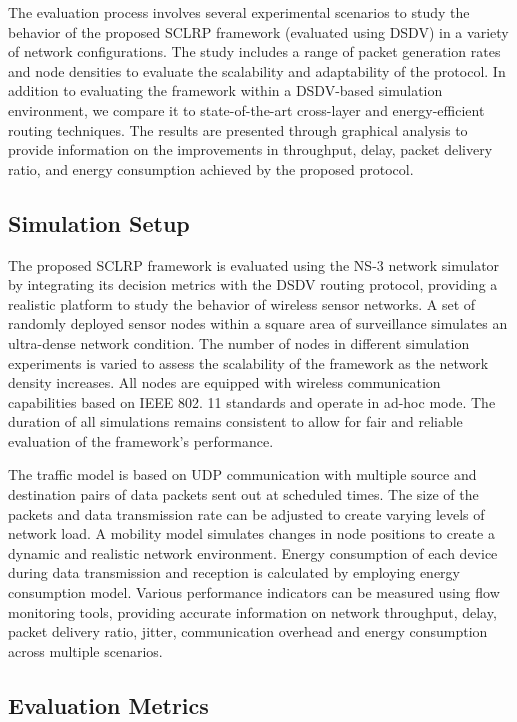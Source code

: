 \documentclass[a4paper,fleqn]{cas-dc}
\numberwithin{equation}{section}
\begin{document}
The evaluation process involves several experimental scenarios to study the behavior of the proposed SCLRP framework (evaluated using DSDV) in a variety of network configurations. The study includes a range of packet generation rates and node densities to evaluate the scalability and adaptability of the protocol. In addition to evaluating the framework within a DSDV-based simulation environment, we compare it to state-of-the-art cross-layer and energy-efficient routing techniques. The results are presented through graphical analysis to provide information on the improvements in throughput, delay, packet delivery ratio, and energy consumption achieved by the proposed protocol.

\subsection{Simulation Setup}

The proposed SCLRP framework is evaluated using the NS-3 network simulator by integrating its decision metrics with the DSDV routing protocol, providing a realistic platform to study the behavior of wireless sensor networks. A set of randomly deployed sensor nodes within a square area of surveillance simulates an ultra-dense network condition. The number of nodes in different simulation experiments is varied to assess the scalability of the framework as the network density increases. All nodes are equipped with wireless communication capabilities based on IEEE 802. 11 standards and operate in ad-hoc mode. The duration of all simulations remains consistent to allow for fair and reliable evaluation of the framework's performance.

The traffic model is based on UDP communication with multiple source and destination pairs of data packets sent out at scheduled times. The size of the packets and data transmission rate can be adjusted to create varying levels of network load. A mobility model simulates changes in node positions to create a dynamic and realistic network environment. Energy consumption of each device during data transmission and reception is calculated by employing energy consumption model. Various performance indicators can be measured using flow monitoring tools, providing accurate information on network throughput, delay, packet delivery ratio, jitter, communication overhead and energy consumption across multiple scenarios.

\subsection{Evaluation Metrics}
\end{document}

